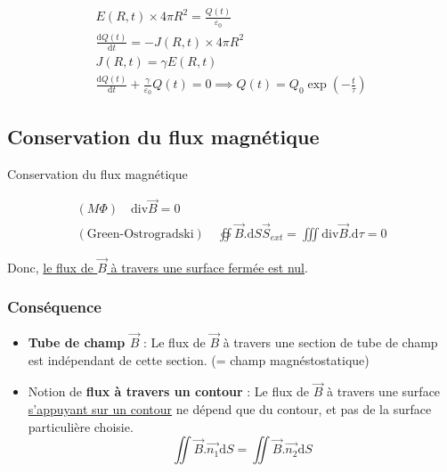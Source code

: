 \begin{myproof}{}{}
    \begin{gather}
      E(R,t) \times 4 \pi R ^{2}  = \frac{Q(t)}{\varepsilon_0}  \\ 
      \frac{\mathrm{d}Q (t)}{\mathrm{d} t}  = - J(R,t) \times 4 \pi R ^{2} \\ 
      J(R, t) = \gamma E(R, t) \\ 
      \frac{\mathrm{d}Q(t)}{\mathrm{d}t}  + \frac{\gamma}{\varepsilon_0}  Q(t) = 0 \implies Q(t) = Q_0 \exp \left( - \frac{t}{\tau}  \right)
    \end{gather}
\end{myproof}




\subsection{Conservation du flux magnétique} %
\label{sub:Conservation du flux magnétique}

\begin{Theorem}{Conservation du flux magnétique}{}

  \begin{gather}
    (M \Phi) \quad \mathrm{div} \overrightarrow{B} = 0 \\ 
  (\text{Green-Ostrogradski}) \quad \oiint \overrightarrow{B} . \mathrm{d} S \overrightarrow{S} _{ext} = \iiint \mathrm{div} \overrightarrow{B} . \mathrm{d} \tau = 0
  \end{gather}

Donc, \underline{le flux de $\overrightarrow{B}$ à travers une surface fermée est nul}.
\end{Theorem}



\subsubsection{Conséquence} %
\label{sec:Conséquence}
\begin{itemize}

    \item \textbf{Tube de champ $\overrightarrow{B}$} : Le flux de $\overrightarrow{B}$ à travers une section de tube de champ est indépendant de cette section. (= champ magnéstostatique) 

    \item Notion de \textbf{flux à travers un contour} : Le flux de $\overrightarrow{B}$ à travers une surface \underline{s'appuyant sur un contour} ne dépend que du contour, et pas de la surface particulière choisie. 
      \begin{equation}
        \iint \overrightarrow{B}. \overrightarrow{n_1} \mathrm{d} S = \iint \overrightarrow{B} . \overrightarrow{n_2} \mathrm{d}S
      \end{equation}

\end{itemize}

